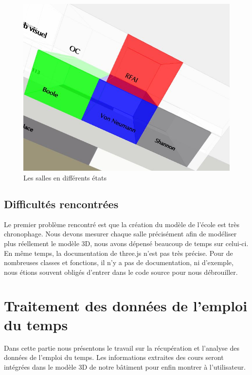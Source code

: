 \documentclass[twoside]{EPURapport}
\begin{document}
\begin{figure}[!htbp]
	\centering
		\includegraphics[scale=0.6]{img/stats.JPG}
	\caption{Les salles en différents états}
	\label{fig:color} 
\end{figure}
\bigskip

\subsection{Difficultés rencontrées}

Le premier problème rencontré est que la création du modèle de l'école est très chronophage. Nous devons mesurer chaque salle précisément afin de modéliser plus réellement le modèle 3D, nous avons dépensé beaucoup de temps sur celui-ci. En même temps, la documentation de three.js n'est pas très précise. Pour de nombreuses classes et fonctions, il n'y a pas de documentation, ni d'exemple, nous étions souvent obligés d'entrer dans le code source pour nous débrouiller.


\section{Traitement des données de l'emploi du temps}
Dans cette partie nous présentons le travail sur la récupération et l'analyse des données de l'emploi du temps. Les informations extraites des cours seront intégrées dans le modèle 3D de notre bâtiment pour enfin montrer à l'utilisateur.
\end{document}
